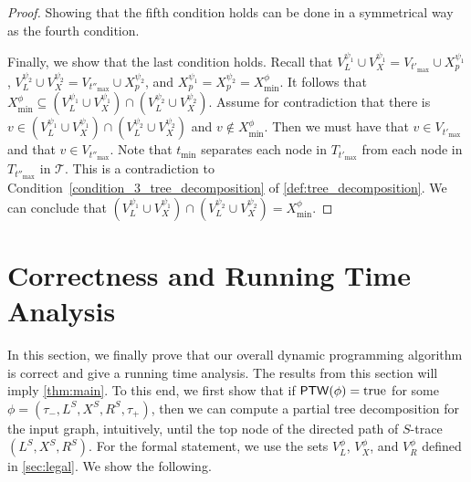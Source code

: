 \documentclass[a4paper,UKenglish,cleveref, autoref, thm-restate, numberwithinsect]{lipics-v2021}
\newcounter{algorithm}
\newcommand{\ptw}{\mathsf{PTW}}
\newcommand{\true}{\textup{true}}
\begin{document}
\begin{proof}
Showing that the fifth condition holds can be done in a symmetrical way as the fourth condition.

Finally, we show that the last condition holds. 
Recall that $V^{\psi_1}_L\cup V^{\psi_1}_X=V_{t'_{\max}}\cup X^{\psi_1}_p$, $V^{\psi_2}_L\cup V^{\psi_2}_X=V_{t''_{\max}}\cup X^{\psi_2}_p$, and $X^{\psi_1}_p=X^{\psi_2}_p=X^\phi_{\min}$. 
It follows that $X^\phi_{\min}\subseteq (V^{\psi_1}_L\cup V^{\psi_1}_X)\cap (V^{\psi_2}_L\cup V^{\psi_2}_X)$.
Assume for contradiction that there is $v\in (V^{\psi_1}_L\cup V^{\psi_1}_X)\cap (V^{\psi_2}_L\cup V^{\psi_2}_X)$ and $v\notin X^\phi_{\min}$. 
Then we must have that $v\in V_{t'_{\max}}$ and that $v \in V_{t''_{\max}}$. 
Note that $t_{\min}$ separates each node in $T_{t'_{\max}}$ from each node in $T_{t''_{\max}}$ in $\mathcal{T}$. 
This is a contradiction to Condition~\ref{condition_3_tree_decomposition} of \cref{def:tree_decomposition}. We can conclude that $(V^{\psi_1}_L\cup V^{\psi_1}_X)\cap (V^{\psi_2}_L\cup V^{\psi_2}_X)= X^\phi_{\min}$.
\end{proof}







\section{Correctness and Running Time Analysis}\label{sec:correct}



In this section, we finally prove that our overall dynamic programming algorithm is correct and give a running time analysis. The results from this section will imply \cref{thm:main}. To this end, we first show that if $\ptw(\phi)=\true$ for some $\phi=(\tau_-,L^S, X^S, R^S,\tau_+)$, then we can compute a partial tree decomposition for the input graph, intuitively, until the top node of the directed path of $S$-trace $(L^S, X^S, R^S)$. For the formal statement, we use the sets $V^\phi_L$, $V^\phi_X$, and $V^\phi_R$ defined in \cref{sec:legal}. We show the following.
\end{document}
